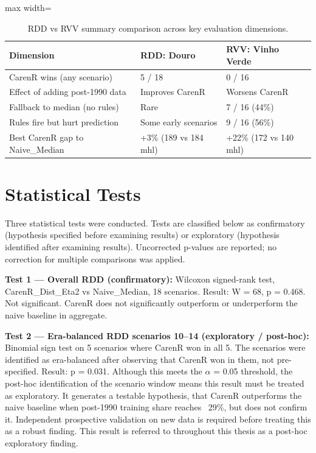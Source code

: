 \begin{table}[htbp]
  \centering
  \caption{RDD vs RVV summary comparison across key evaluation dimensions.}\label{tab:ch5a_5}
  \small
  \begin{adjustbox}{max width=\textwidth}
    \begin{tabularx}{\textwidth}{l|l|X}
  \toprule
  Dimension & RDD: Douro & RVV: Vinho Verde \\
  \midrule
  CarenR wins (any scenario) & 5 / 18 & 0 / 16 \\
  Effect of adding post-1990 data & Improves CarenR & Worsens CarenR \\
  Fallback to median (no rules) & Rare & 7 / 16 (44\%) \\
  Rules fire but hurt prediction & Some early scenarios & 9 / 16 (56\%) \\
  Best CarenR gap to Naive\_Median & +3\% (189 vs 184 mhl) & +22\% (172 vs 140 mhl) \\
  \bottomrule
\end{tabularx}
  \end{adjustbox}

\end{table}



\section{Statistical Tests}\label{sec:statistical_tests}

Three statistical tests were conducted. Tests are classified below as confirmatory (hypothesis specified before examining results) or exploratory (hypothesis identified after examining results). Uncorrected p-values are reported; no correction for multiple comparisons was applied.

\textbf{Test 1 --- Overall RDD (confirmatory): }Wilcoxon signed-rank test, CarenR\_Dist\_Eta2 vs Naive\_Median, 18 scenarios. Result: W = 68, p = 0.468. Not significant. CarenR does not significantly outperform or underperform the naive baseline in aggregate.

\textbf{Test 2 --- Era-balanced RDD scenarios 10--14 (exploratory / post-hoc): }Binomial sign test on 5 scenarios where CarenR won in all 5. The scenarios were identified as era-balanced after observing that CarenR won in them, not pre-specified. Result: p = 0.031. Although this meets the $\alpha$ = 0.05 threshold, the post-hoc identification of the scenario window means this result must be treated as exploratory. It generates a testable hypothesis, that CarenR outperforms the naive baseline when post-1990 training share reaches ~29\%, but does not confirm it. Independent prospective validation on new data is required before treating this as a robust finding. This result is referred to throughout this thesis as a post-hoc exploratory finding.

